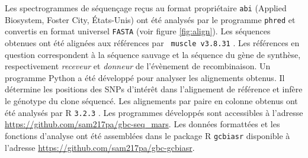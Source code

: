 Les spectrogrammes de séquençage reçus au format propriétaire \texttt{abi}
(Applied Biosystem, Foster City, États-Unis) ont été analysés par le programme
\texttt{phred} \cite{ewing_base-calling_1998} et convertis en format universel
\texttt{FASTA} (voir figure \ref{fig:align}). Les séquences obtenues ont été
alignées aux références par \texttt{ muscle v3.8.31} \cite{edgar_muscle:_2004}.
Les références en question correspondent à la séquence sauvage et la séquence du
gène de synthèse, respectivement \emph{receveur} et \emph{donneur} de
l'évènement de recombinaison. Un programme Python \cite{cock_biopython:_2009} a
été développé pour analyser les alignements obtenus. Il détermine les positions
des SNPs d'intérêt dans l'alignement de référence et infère le génotype du clone
séquencé. Les alignements par paire en colonne obtenus ont été analysés par
\textrm{R} \texttt{3.2.3} \cite{r_core_team_r:_2015}. Les programmes développés
sont accessibles à l'adresse \url{https://github.com/sam217pa/gbc-seq_mars}. Les
données formattées et les fonctions d'analyse ont été assemblées dans le package
\textrm{R} \texttt{gcbiasr} disponible à l'adresse
\url{https://github.com/sam217pa/gbc-gcbiasr}.
